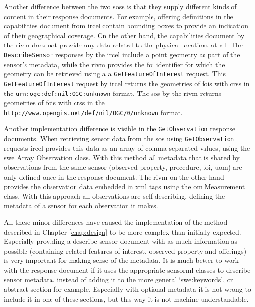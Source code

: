 \begin{sloppypar}
Another difference between the two \aclp{sos} is that they supply different kinds of content in their response documents. For example, offering definitions in the capabilities document from \ac{ircel} contain bounding boxes to provide an indication of their geographical coverage. On the other hand, the capabilities document by the \ac{rivm} does not provide any data related to the physical locations at all. The \texttt{DescribeSensor} responses by the \ac{ircel} include a point geometry as part of the sensor's metadata, while the \ac{rivm} provides the \ac{foi} identifier for which the geometry can be retrieved using a a \texttt{GetFeatureOfInterest} request. This \texttt{GetFeatureOfInterest} request by \ac{ircel} returns the geometries of \acp{foi} with \acp{crs} in the \texttt{urn:ogc:def:nil:OGC:unknown} format. The \ac{sos} by the \ac{rivm} returns geometries of \acp{foi} with \acp{crs} in the \texttt{http://www.opengis.net/def/nil/OGC/0/unknown} format. 
\end{sloppypar}

\begin{sloppypar}
Another implementation difference is visible in the \texttt{GetObservation} response documents. When retrieving sensor data from the \ac{sos} using \texttt{GetObservation} requests \ac{ircel} provides this data as an array of comma separated values, using the \ac{swe} Array Observation class. With this method all metadata that is shared by observations from the same sensor (observed property, procedure, \ac{foi}, \ac{uom}) are only defined once in the response document. The \ac{rivm} on the other hand provides the observation data embedded in \ac{xml} tags using the \ac{om} Measurement class. With this approach all observations are self describing, defining the metadata of a sensor for each observation it makes.   
\end{sloppypar}

All these minor differences have caused the implementation of the method described in Chapter \ref{chap:design} to be more complex than initially expected. Especially providing a describe sensor document with as much information as possible (containing related features of interest, observed property and offerings) is very important for making sense of the metadata. It is much better to work with the response document if it uses the appropriate \ac{sensorml} classes to describe sensor metadata, instead of adding it to the more general `swe:keywords', or abstract section for example. Especially with optional metadata it is not wrong to include it in one of these sections, but this way it is not machine understandable. 

